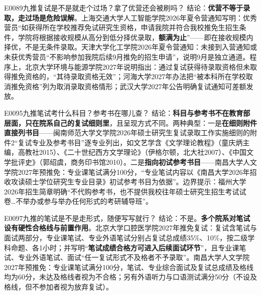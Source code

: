 \begin{qa}{E0089}{九推复试是不是就走个过场？拿了优营还会被刷吗？}
结论：\textbf{优营不等于录取，走过场是危险误解}。上海交通大学人工智能学院2026年夏令营通知写明：优秀营员“如获得所在学校推荐免试研究生资格，申请我院并符合我校推免生招生条件，学院将根据接收规模从高分到低分择优录取，\textbf{额满为止}”——即在接收规模内择优，不是无条件录取。天津大学化工学院2026年夏令营通知：未接到入营通知或未获优秀营员“不影响参加我院后续9月推免的招生申请”，说明9月是独立通道。程序上，北京大学环境与能源学院2027年说明指出：通过复试获得待录取资格但未取得推免资格的，“其待录取资格无效”；河海大学2027年办法把“被本科所在学校取消推免资格”列为取消录取资格情形；武汉大学2027年公告明确复试通知可差额发放。
\end{qa}

\begin{qa}{E0095}{九推笔试考什么科目？参考书在哪儿查？}
结论：\textbf{科目与参考书不在教育部层面，只在院系自己的复试细则里}，且呈现方式不同。两种典型：一是\textbf{在细则附件直接列书目}——闽南师范大学文学院2026年硕士研究生复试录取工作实施细则的附件2“复试专业及参考书目”逐专业列出，如文艺学含《文学理论教程》（童庆炳主编，高教社2015）、《二十世纪西方文学理论》（伊格尔顿，北大社2007）、《中国文学批评史》（郭绍虞，商务印书馆2010）。二是\textbf{指向初试参考书目}——南昌大学人文学院2027年预推免：专业课笔试满分100分，“专业笔试内容以《南昌大学2026年招收攻读硕士学位研究生专业目录》初试参考书目为依据”。边界提示：福州大学2026年招生简章明确“不代购参考书，也不提供我校往年硕士研究生招生考试试卷…不举办或参与举办任何形式的考研辅导班”。
\end{qa}

\begin{qa}{E0097}{九推的笔试是不是走形式，随便写写就行？}
结论：不是。\textbf{多个院系对笔试设有硬性合格线与前置作用}。北京大学口腔医学院2027年推免复试：复试含笔试与面试两部分，专业课笔试、专业外语笔试分别占复试总成绩35\%、10\%，按二级学科命题、各1小时；并写明“\textbf{笔试成绩合格方可进入后续面试环节}”，且专业课笔试、专业外语笔试、面试“任一复试形式不及格者不予录取”。南昌大学人文学院2027年预推免：专业课笔试满分100分，笔试、专业综合面试及复试总成绩及格线均为60分，未达及格线者视为不合格；另有外语听力与口语测试满分50分（不设及格线，但不参加者视为放弃复试）。
\end{qa}

